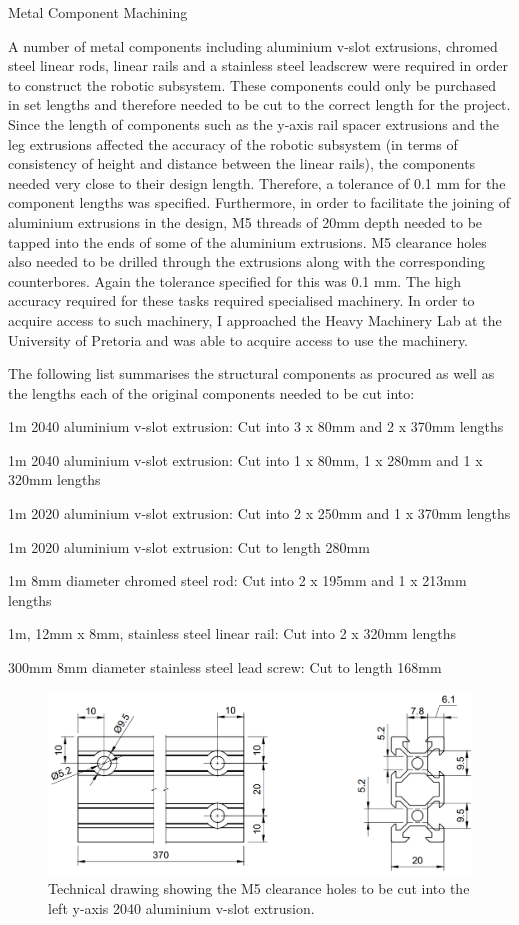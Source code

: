 Metal Component Machining

A number of metal components including aluminium v-slot extrusions, chromed steel linear rods, linear rails and a stainless steel leadscrew were required in order to construct the robotic subsystem. These components could only be purchased in set lengths and therefore needed to be cut to the correct length for the project. Since the length of components such as the y-axis rail spacer extrusions and the leg extrusions affected the accuracy of the robotic subsystem (in terms of consistency of height and distance between the linear rails), the components needed very close to their design length. Therefore, a tolerance of 0.1 mm for the component lengths was specified. Furthermore, in order to facilitate the joining of aluminium extrusions in the design, M5 threads of 20mm depth needed to be tapped into the ends of some of the aluminium extrusions. M5 clearance holes also needed to be drilled through the extrusions along with the corresponding counterbores. Again the tolerance specified for this was 0.1 mm. The high accuracy required for these tasks required specialised machinery. In order to acquire access to such machinery, I approached the Heavy Machinery Lab at the University of Pretoria and was able to acquire access to use the machinery.

The following list summarises the structural components as procured as well as the lengths each of the original components needed to be cut into:

\begin{compactitem}
	\item 1m 2040 aluminium v-slot extrusion: Cut into 3 x 80mm and 2 x 370mm lengths
	\item 1m 2040 aluminium v-slot extrusion: Cut into 1 x 80mm, 1 x 280mm and 1 x 320mm lengths
	\item 1m 2020 aluminium v-slot extrusion: Cut into 2 x 250mm and 1 x 370mm lengths
	\item 1m 2020 aluminium v-slot extrusion: Cut to length 280mm
	\item 1m 8mm diameter chromed steel rod: Cut into 2 x 195mm and 1 x 213mm lengths
	\item 1m, 12mm x 8mm, stainless steel linear rail: Cut into 2 x 320mm lengths
	\item 300mm 8mm diameter stainless steel lead screw: Cut to length 168mm
\end{compactitem}

\begin{figure}[H]
	\centering
	\includegraphics[width=0.7\linewidth]{figures/hg2-001-drawing.png}
	\caption{Technical drawing showing the M5 clearance holes to be cut into the left y-axis 2040 aluminium v-slot extrusion.}
	\label{fig:hg2-001-drawing}
\end{figure}

